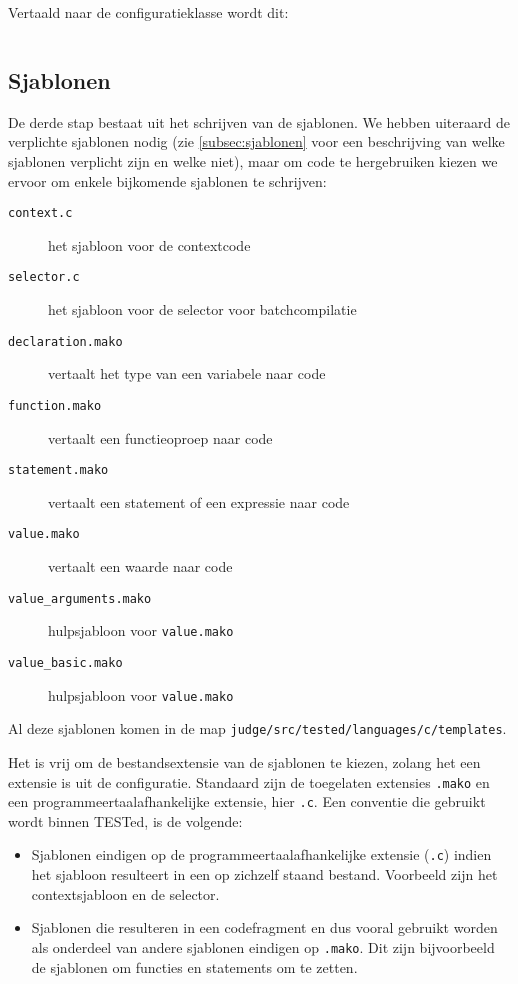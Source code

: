 Vertaald naar de configuratieklasse wordt dit:

\inputminted[firstline=24,lastline=41,gobble=4]{python}{sources/c-config.py}

\subsection{Sjablonen}\label{subsec:manual-sjablonen}

De derde stap bestaat uit het schrijven van de sjablonen.
We hebben uiteraard de verplichte sjablonen nodig (zie \cref{subsec:sjablonen} voor een beschrijving van welke sjablonen verplicht zijn en welke niet), maar om code te hergebruiken kiezen we ervoor om enkele bijkomende sjablonen te schrijven:

\begin{description}
    \item[\texttt{context.c}] het sjabloon voor de contextcode
    \item[\texttt{selector.c}] het sjabloon voor de selector voor batchcompilatie
    \item[\texttt{declaration.mako}] vertaalt het type van een variabele naar code
    \item[\texttt{function.mako}] vertaalt een functieoproep naar code
    \item[\texttt{statement.mako}] vertaalt een statement of een expressie naar code
    \item[\texttt{value.mako}] vertaalt een waarde naar code
    \item[\texttt{value\_arguments.mako}] hulpsjabloon voor \texttt{value.mako}
    \item[\texttt{value\_basic.mako}] hulpsjabloon voor \texttt{value.mako}
\end{description}

Al deze sjablonen komen in de map \texttt{judge/src/tested/languages/c/templates}.

Het is vrij om de bestandsextensie van de sjablonen te kiezen, zolang het een extensie is uit de configuratie.
Standaard zijn de toegelaten extensies \texttt{.mako} en een programmeertaalafhankelijke extensie, hier \texttt{.c}.
Een conventie die gebruikt wordt binnen TESTed, is de volgende:

\begin{itemize}
    \item Sjablonen eindigen op de programmeertaalafhankelijke extensie (\texttt{.c}) indien het sjabloon resulteert in een op zichzelf staand bestand.
    Voorbeeld zijn het contextsjabloon en de selector.
    \item Sjablonen die resulteren in een codefragment en dus vooral gebruikt worden als onderdeel van andere sjablonen eindigen op \texttt{.mako}.
    Dit zijn bijvoorbeeld de sjablonen om functies en statements om te zetten.
\end{itemize}

